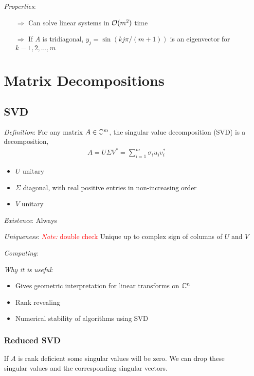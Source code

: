 \documentclass[12pt]{article}
\newcommand{\note}[1]{\textcolor{red}{\textit{Note:} #1}}
\begin{document}
\textit{Properties}:
\begin{itemize}[nolistsep]
    \item[\(\Rightarrow\)] Can solve linear systems in \( \mathcal{O}(m^2) \) time
    \item[\(\Rightarrow\)] If \( A \) is tridiagonal, \( y_j = \sin(k j \pi / (m+1)) \) is an eigenvector for \( k=1,2,\ldots, m \)
\end{itemize}



\pagebreak
\section{Matrix Decompositions}

\subsection{SVD}
\textit{Definition}: For any matrix \( A\in\mathbb{C}^m \), the singular value decomposition (SVD) is a decomposition,
\begin{align*}
    A = U\Sigma V^* = \sum_{i=1}^{m} \sigma_i u_iv_i^*
\end{align*}
\begin{itemize}[nolistsep]
    \item \( U \) unitary
    \item \( \Sigma \) diagonal, with real positive entries in non-increasing order
    \item \( V \) unitary
\end{itemize}

\textit{Existence}:
Always

\textit{Uniqueness}:
\note{double check}
Unique up to complex sign of columns of \( U \) and \( V \)

\textit{Computing}:

\textit{Why it is useful}:
\begin{itemize}[nolistsep]
    \item Gives geometric interpretation for linear transforms on \( \mathbb{C}^n \)
    \item Rank revealing
    \item Numerical stability of algorithms using SVD
\end{itemize}

\subsubsection{Reduced SVD}
If \( A \) is rank deficient some singular values will be zero. We can drop these singular values and the corresponding singular vectors.
\end{document}
